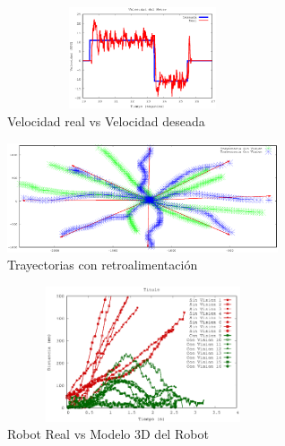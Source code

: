 \documentclass[twocolumn,10pt]{amrob}
\begin{document}
\begin{figure}
  \centering
    \includegraphics[height=3cm,width=8cm]{VelocidadM4.eps}
  \caption{Velocidad real vs Velocidad deseada}
  \label{fig:realVSdes}
\end{figure}
\begin{figure}
  \centering
    \includegraphics[width=8cm]{output1.eps}
  \caption{Trayectorias con retroalimentación}
  \label{fig:visionPruebasRetro}
\end{figure}
\begin{figure}
  \centering
    \includegraphics[height=4cm,width=8cm]{DistErr.eps}
  \caption{Robot Real vs Modelo 3D del Robot}
  \label{fig:errorPlot}
\end{figure}



\end{document}
